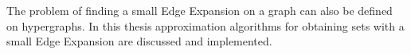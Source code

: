 \chapter{\abstractname}


The problem of finding a small Edge Expansion on a graph can also be defined on hypergraphs. In this thesis approximation algorithms for obtaining sets with a small Edge Expansion are discussed and implemented.



